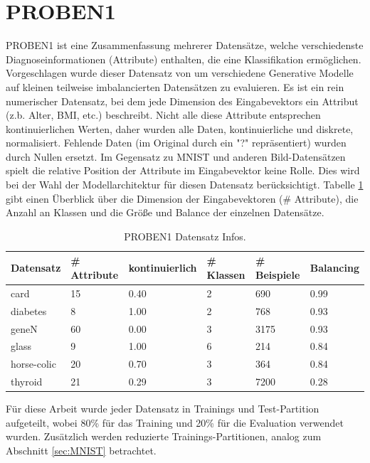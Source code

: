 \section{PROBEN1}\label{sec:PROBEN1_dataset}
PROBEN1 ist eine Zusammenfassung mehrerer Datensätze, welche verschiedenste Diagnoseinformationen (Attribute) enthalten, die eine Klassifikation ermöglichen. Vorgeschlagen wurde dieser Datensatz von \cite{Moreno-Barea2020} um verschiedene Generative Modelle auf kleinen teilweise imbalancierten Datensätzen zu evaluieren. Es ist ein rein numerischer Datensatz, bei dem jede Dimension des Eingabevektors ein Attribut (z.b. Alter, BMI, etc.) beschreibt. Nicht alle diese Attribute entsprechen kontinuierlichen Werten, daher wurden alle Daten, kontinuierliche und diskrete, normalisiert. Fehlende Daten (im Original durch ein "?" repräsentiert) wurden durch Nullen ersetzt. Im Gegensatz zu MNIST und anderen Bild-Datensätzen spielt die relative Position der Attribute im Eingabevektor keine Rolle. Dies wird bei der Wahl der Modellarchitektur für diesen Datensatz berücksichtigt.
 Tabelle \ref{tab:PROBEN1-datasets} gibt einen Überblick über die Dimension der Eingabevektoren (\# Attribute), die Anzahl an Klassen und die Größe und Balance der einzelnen Datensätze.
\begin{table}[hbt]
\centering
\begin{tabular}{l|l|l|l|l|l}
\toprule
Datensatz   & \# Attribute & kontinuierlich        & \# Klassen & \# Beispiele & Balancing \\ \hline
card        & 15           & 0.40                  & 2          & 690          & 0.99      \\
diabetes    & 8            & 1.00                  & 2          & 768          & 0.93      \\
geneN       & 60           & 0.00                  & 3          & 3175         & 0.93      \\
glass       & 9            & 1.00                  & 6          & 214          & 0.84      \\
horse-colic & 20           & 0.70                  & 3          & 364          & 0.84      \\
thyroid     & 21           & 0.29                  & 3          & 7200         & 0.28      \\
\bottomrule
\end{tabular}
\caption{PROBEN1 Datensatz Infos.}
\label{tab:PROBEN1-datasets}
\end{table}
Für diese Arbeit wurde jeder Datensatz in Trainings und Test-Partition aufgeteilt, wobei 80\% für das Training und 20\% für die Evaluation verwendet wurden. Zusätzlich werden reduzierte Trainings-Partitionen, analog zum Abschnitt \ref{sec:MNIST} betrachtet.


